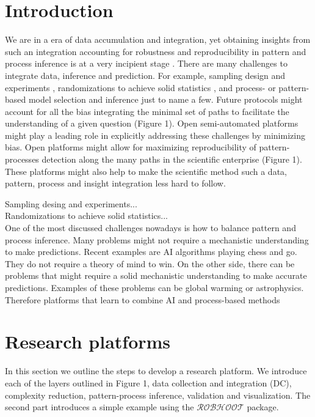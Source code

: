 \documentclass[english,12pt]{article}
\begin{document}
\section{Introduction}
We are in a era of data accumulation and integration, yet obtaining
insights from such an integration accounting for robustness and
reproducibility in pattern and process inference is at a very
incipient stage \citep{Ioannidis2005}. There are many challenges to
integrate data, inference and prediction. For example, sampling design
and experiments  \citep{Voelkl2018},
randomizations to achieve solid statistics ,
and process- or pattern-based model selection and inference
 just to name a few. Future protocols might
account for all the bias integrating the minimal set of paths to
facilitate the understanding of a given question (Figure 1). Open
semi-automated platforms  might play a
leading role in explicitly addressing these challenges by minimizing
bias. Open platforms might allow for maximizing reproducibility of
pattern-processes detection along the many paths in the scientific
enterprise (Figure 1). These platforms might also help to make the
scientific method such a data, pattern, process and insight
integration less hard to follow.

Sampling desing and experiments...\\

Randomizations to achieve solid statistics...\\

One of the most discussed challenges nowadays is how to balance
pattern and process inference. Many problems might not require a
mechanistic understanding to make predictions. Recent examples are AI
algorithms playing chess and go. They do not require a theory of mind
to win. On the other side, there can be problems that might require a
solid mechanistic understanding to make accurate predictions. Examples
of these problems can be global warming or astrophysics. Therefore
platforms that learn to combine AI and process-based methods




\section{Research platforms}
In this section we outline the steps to develop a research
platform. We introduce each of the layers outlined in Figure 1, data
collection and integration (DC), complexity reduction, pattern-process
inference, validation and visualization. The second part introduces a
simple example using the $\mathcal{ROBHOOT}$ package.
\end{document}
